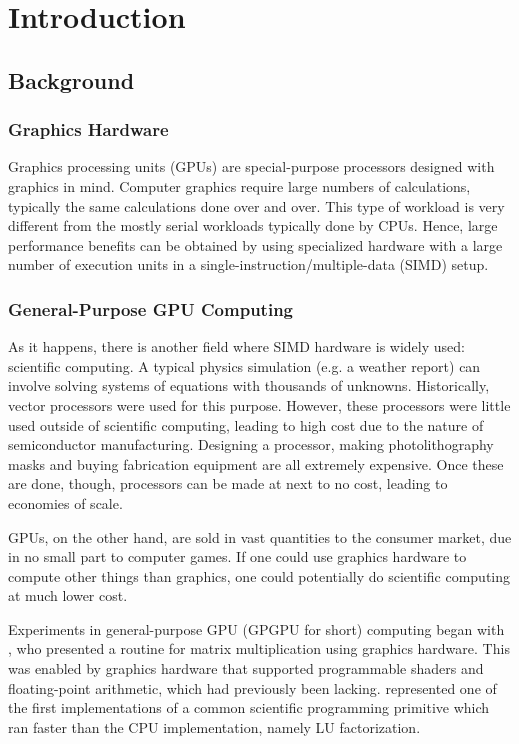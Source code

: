 \chapter{Introduction}

\section{Background}
\subsection{Graphics Hardware}
Graphics processing units (GPUs) are special-purpose processors designed with graphics in mind. Computer graphics require large numbers of calculations, typically the same calculations done over and over. This type of workload is very different from the mostly serial workloads typically done by CPUs. Hence, large performance benefits can be obtained by using specialized hardware with a large number of execution units in a single-instruction/multiple-data (SIMD) setup.

\subsection{General-Purpose GPU Computing}
As it happens, there is another field where SIMD hardware is widely used: scientific computing. A typical physics simulation (e.g. a weather report) can involve solving systems of equations with thousands of unknowns. Historically, vector processors were used for this purpose. However, these processors were little used outside of scientific computing, leading to high cost due to the nature of semiconductor manufacturing. Designing a processor, making photolithography masks and buying fabrication equipment are all extremely expensive. Once these are done, though, processors can be made at next to no cost, leading to economies of scale. 

GPUs, on the other hand, are sold in vast quantities to the consumer market, due in no small part to computer games. If one could use graphics hardware to compute other things than graphics, one could potentially do scientific computing at much lower cost.

Experiments in general-purpose GPU (GPGPU for short) computing began with \citet{larsen2001fast}, who presented a routine for matrix multiplication using graphics hardware. This was enabled by graphics hardware that supported programmable shaders and floating-point arithmetic, which had previously been lacking. \citet{galoppo2005lu} represented one of the first implementations of a common scientific programming primitive which ran faster than the CPU implementation, namely LU factorization.

